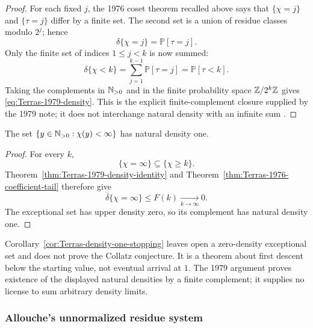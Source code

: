 \begin{proof}
For each fixed \(j\), the 1976 coset theorem recalled above says that
\(\{\chi=j\}\) and \(\{\tau=j\}\) differ by a finite set.  The second set is
a union of residue classes modulo \(2^j\); hence
\[
 \delta\{\chi=j\}=\mathbb P[\tau=j].
\]
Only the finite set of indices \(1\le j<k\) is now summed:
\[
 \delta\{\chi<k\}
 =\sum_{j=1}^{k-1}\mathbb P[\tau=j]
 =\mathbb P[\tau<k].
\]
Taking the complements in \(\mathbb{N}_{>0}\) and in the finite probability space
\(\mathbb{Z}/2^k\mathbb{Z}\) gives \eqref{eq:Terras-1979-density}.  This is the explicit
finite-complement closure supplied by the 1979 note; it does not interchange
natural density with an infinite sum
\cite[pp.~101--102]{Terras1979}.
\end{proof}

\begin{corollary}
\label{cor:Terras-density-one-stopping}
The set \(\{y\in\mathbb{N}_{>0}:\chi(y)<\infty\}\) has natural density one.
\end{corollary}

\begin{proof}
For every \(k\),
\[
 \{\chi=\infty\}\subseteq\{\chi\ge k\}.
\]
Theorem~\ref{thm:Terras-1979-density-identity} and
Theorem~\ref{thm:Terras-1976-coefficient-tail} therefore give
\[
 \overline\delta\{\chi=\infty\}
 \le F(k)\xrightarrow[k\to\infty]{}0.
\]
The exceptional set has upper density zero, so its complement has natural
density one.
\end{proof}

\begin{nonclaim}
Corollary~\ref{cor:Terras-density-one-stopping} leaves open a zero-density
exceptional set and does not prove the Collatz conjecture.  It is a theorem
about first descent below the starting value, not eventual arrival at \(1\).
The 1979 argument proves existence of the displayed natural densities by a
finite complement; it supplies no license to sum arbitrary density limits.
\end{nonclaim}

\subsubsection{Allouche's unnormalized residue system}

